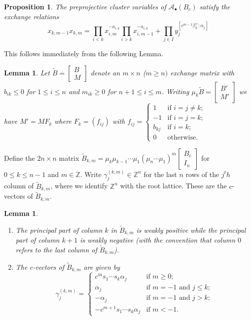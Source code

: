 \documentclass[12pt]{amsart}
\newcommand{\cAb}{\mathcal{A}_\bullet}
\newcommand{\ZZ}{\mathbb{Z}}
\newtheorem{lemma}[theorem]{Lemma}
\newtheorem{proposition}[theorem]{Proposition}
\numberwithin{equation}{section}
\begin{document}
\begin{proposition}
  The preprojective cluster variables of $\cAb(B_c)$ satisfy the exchange relations
  \begin{equation}
    x_{k,m-1}x_{k,m} = \prod_{i<k}x_{i,m}^{-a_{i,k}} \prod_{i>k}x_{i,m-1}^{-a_{i,k}} + \prod_{j\in I}y_j^{[c^{m-1}\beta_k^+:\alpha_j]}
  \end{equation}
\end{proposition}
This follows immediately from the following Lemma.
\begin{lemma}\label{le:positive mutations}
  Let $\tilde B=\left[\begin{array}{c} B\\ M\end{array}\right]$ denote an $m\times n$ ($m\ge n)$ exchange matrix with $b_{ik}\le0$ for $1\le i\le n$ and $m_{ik}\ge0$ for $n+1\le i\le m$.  Writing $\mu_k\tilde B=\left[\begin{array}{c} B'\\ M'\end{array}\right]$ we have $M'=MF_k$ where $F_k=(f_{ij})$ with $f_{ij}=\begin{cases}1 & \text{if $i=j\ne k$;}\\ -1 & \text{if $i=j=k$;}\\ b_{kj} & \text{if $i=k$;}\\ 0 & \text{otherwise.}\end{cases}$
\end{lemma}
Define the $2n\times n$ matrix $\tilde B_{k,m}=\mu_k\mu_{k-1}\cdots\mu_1(\mu_n\cdots\mu_1)^m\left[\begin{array}{c} B_c\\ I_n\end{array}\right]$ for $0\le k\le n-1$ and $m\in\ZZ$.  Write $\gamma^{(k,m)}_j\in\ZZ^n$ for the last $n$ rows of the $j^th$ column of $\tilde B_{k,m}$, where we identify $\ZZ^n$ with the root lattice.  These are the $c$-vectors of $\tilde B_{k,m}$.
\begin{lemma}\mbox{}
  \begin{enumerate}
    \item The principal part of column $k$ in $\tilde B_{k,m}$ is weakly positive while the principal part of column $k+1$ is weakly negative (with the convention that column $0$ refers to the last column of $\tilde B_{k,m}$).
    \item The $c$-vectors of $\tilde B_{k,m}$ are given by 
    \[\gamma^{(k,m)}_j=\begin{cases}c^m s_1\cdots s_k\alpha_j & \text{if $m\ge0$;}\\\alpha_j & \text{if $m=-1$ and $j\le k$;}\\-\alpha_j & \text{if $m=-1$ and $j>k$;}\\-c^{m+1} s_1\cdots s_k\alpha_j & \text{if $m<-1$.}\end{cases}\]
  \end{enumerate}
\end{lemma}
\end{document}
